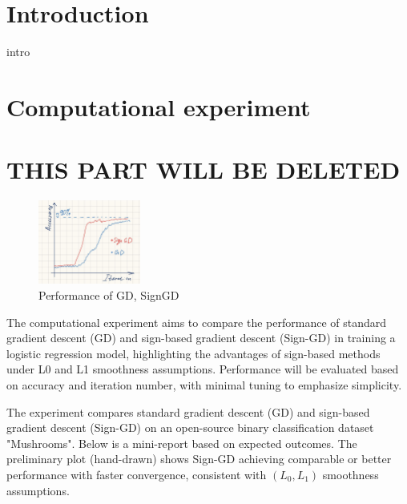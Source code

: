 \documentclass[12pt]{article}
\begin{document}
\section{Introduction}


{intro}


\section{Computational experiment}

\section*{THIS PART WILL BE DELETED}

\begin{figure}[!h]
    \centering
    \includegraphics[width=0.3\textwidth]{drawing.jpg}
    \caption{Performance of GD, SignGD}
    \label{fig:logreg}
\end{figure}

The computational experiment aims to compare the performance of standard gradient descent (GD) and sign-based gradient descent (Sign-GD) in training a logistic regression model, highlighting the advantages of sign-based methods under L0 and L1 smoothness assumptions. Performance will be evaluated based on accuracy and iteration number, with minimal tuning to emphasize simplicity.

The experiment compares standard gradient descent (GD) and sign-based gradient descent (Sign-GD) on an open-source binary classification dataset "Mushrooms". Below is a mini-report based on expected outcomes.
The preliminary plot (hand-drawn) shows Sign-GD achieving comparable or better performance with faster convergence, consistent with $(L_0, L_1)$ smoothness assumptions.
\end{document}
